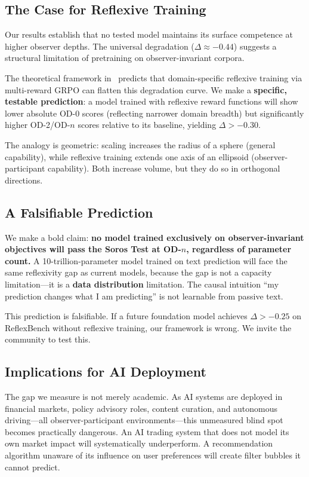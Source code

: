 \documentclass{article}
\begin{document}
\subsection{The Case for Reflexive Training}

Our results establish that no tested model maintains its surface competence at higher observer depths. The universal degradation ($\Delta \approx -0.44$) suggests a structural limitation of pretraining on observer-invariant corpora.

The theoretical framework in~\citep{anon2026} predicts that domain-specific reflexive training via multi-reward GRPO can flatten this degradation curve. We make a \textbf{specific, testable prediction}: a model trained with reflexive reward functions will show lower absolute OD-0 scores (reflecting narrower domain breadth) but significantly higher OD-2/OD-$n$ scores relative to its baseline, yielding $\Delta > -0.30$.

The analogy is geometric: scaling increases the radius of a sphere (general capability), while reflexive training extends one axis of an ellipsoid (observer-participant capability). Both increase volume, but they do so in orthogonal directions.

\subsection{A Falsifiable Prediction}

We make a bold claim: \textbf{no model trained exclusively on observer-invariant objectives will pass the Soros Test at OD-$n$, regardless of parameter count.} A 10-trillion-parameter model trained on text prediction will face the same reflexivity gap as current models, because the gap is not a capacity limitation---it is a \textbf{data distribution} limitation. The causal intuition ``my prediction changes what I am predicting'' is not learnable from passive text.

This prediction is falsifiable. If a future foundation model achieves $\Delta > -0.25$ on ReflexBench without reflexive training, our framework is wrong. We invite the community to test this.

\subsection{Implications for AI Deployment}

The gap we measure is not merely academic. As AI systems are deployed in financial markets, policy advisory roles, content curation, and autonomous driving---all observer-participant environments---this unmeasured blind spot becomes practically dangerous. An AI trading system that does not model its own market impact will systematically underperform. A recommendation algorithm unaware of its influence on user preferences will create filter bubbles it cannot predict.
\end{document}
